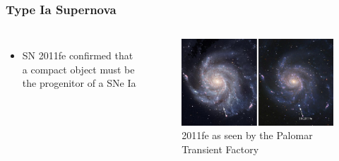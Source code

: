 \documentclass{beamer}
\begin{document}

\begin{frame}
\frametitle{Type Ia Supernova}

\begin{columns}[c]
        \begin{itemize}
                \item SN 2011fe confirmed that a compact object must be the progenitor of a SNe Ia
        \end{itemize}


        \begin{figure}
    \begin{center}
      \includegraphics[width=.90\linewidth]{2011fe.jpg}
            \caption{2011fe as seen by the Palomar Transient Factory}
    \end{center}
  \end{figure}

        \end{columns}

\end{frame}


\end{document}
